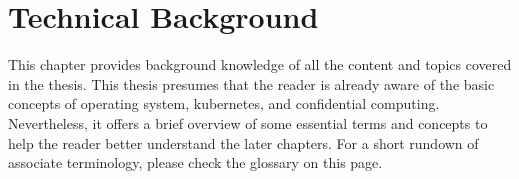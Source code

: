 \chapter{Technical Background}
\label{sec:state}







This chapter provides background knowledge of all the content and topics covered in the thesis. This thesis presumes that the reader is 
already aware of the basic concepts of operating system, kubernetes\cite*{k8s}, and confidential computing. Nevertheless, it offers a brief overview of some essential terms and 
concepts to help the reader better understand the later chapters. For a short rundown of associate terminology, please check the glossary on 
this page.
